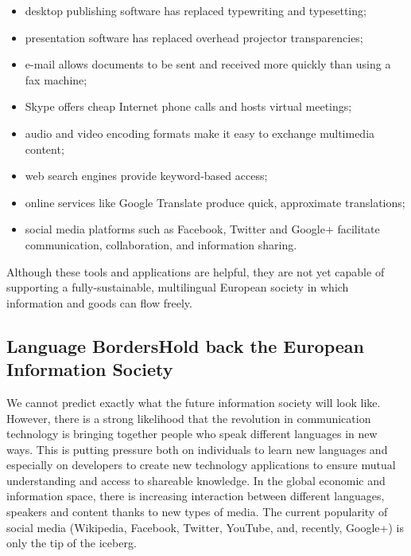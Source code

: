 \begin{multicols}{2}
\begin{itemize}
\item desktop publishing software has replaced typewriting and typesetting;
\item presentation software has replaced overhead projector transparencies;
\item e-mail allows documents to be sent and received more quickly than using a fax machine;
\item Skype offers cheap Internet phone calls and hosts virtual meetings;
\item audio and video encoding formats make it easy to exchange multimedia content;
\item web search engines provide keyword-based access;
\item online services like Google Translate produce quick, approximate translations;
\item social media platforms such as Facebook, Twitter and Google+ facilitate communication, collaboration, and information sharing.
\end{itemize}

Although these tools and applications are helpful, they are not yet capable of supporting a fully-sustainable, multilingual European society in which information and goods can flow freely.

\subsection[Language Borders Hold back the European Information Society]{Language Borders\newline Hold back the European Information Society}

We cannot predict exactly what the future information society will look like. However, there is a strong likelihood that the revolution in communication technology is bringing together people who speak different languages in new ways. This is putting pressure both on individuals to learn new languages and especially on developers to create new technology applications to ensure mutual understanding and access to shareable knowledge. In the global economic and information space, there is increasing interaction between different languages, speakers and content thanks to new types of media. The current popularity of social media (Wikipedia, Facebook, Twitter, YouTube, and, recently, Google+) is only the tip of the iceberg.



\end{multicols}
